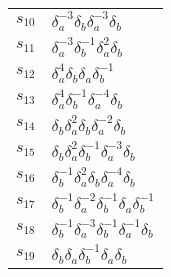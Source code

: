 \documentclass{article}
\begin{document}
\begin{center}
\begin{tabular}{ll}
$s_{10}$ & $\delta_a^{-3}\delta_b^{}\delta_a^{-3}\delta_b^{}$ \\
$s_{11}$ & $\delta_a^{-3}\delta_b^{-1}\delta_a^{2}\delta_b^{}$ \\
$s_{12}$ & $\delta_a^{4}\delta_b^{}\delta_a^{}\delta_b^{-1}$ \\
$s_{13}$ & $\delta_a^{4}\delta_b^{-1}\delta_a^{-4}\delta_b^{}$ \\
$s_{14}$ & $\delta_b^{}\delta_a^{2}\delta_b^{}\delta_a^{-2}\delta_b^{}$ \\
$s_{15}$ & $\delta_b^{}\delta_a^{2}\delta_b^{-1}\delta_a^{-3}\delta_b^{}$ \\
$s_{16}$ & $\delta_b^{-1}\delta_a^{2}\delta_b^{}\delta_a^{-4}\delta_b^{}$ \\
$s_{17}$ & $\delta_b^{-1}\delta_a^{-2}\delta_b^{-1}\delta_a^{}\delta_b^{-1}$ \\
$s_{18}$ & $\delta_b^{-1}\delta_a^{-3}\delta_b^{-1}\delta_a^{-1}\delta_b^{}$ \\
$s_{19}$ & $\delta_b^{}\delta_a^{}\delta_b^{-1}\delta_a^{}\delta_b^{}$ \\
\bottomrule
\end{tabular}
\end{center}

\thispagestyle{empty}
\end{document}
